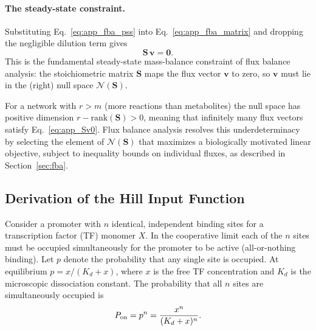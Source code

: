 \paragraph{The steady-state constraint.}
Substituting Eq.~\eqref{eq:app_fba_pss} into Eq.~\eqref{eq:app_fba_matrix}
and dropping the negligible dilution term gives
\begin{equation}\label{eq:app_Sv0}
  \boxed{\mathbf{S}\,\mathbf{v} = \mathbf{0}.}
\end{equation}
This is the fundamental steady-state mass-balance constraint of flux balance
analysis: the stoichiometric matrix $\mathbf{S}$ maps the flux vector
$\mathbf{v}$ to zero, so $\mathbf{v}$ must lie in the (right) null space
$\mathcal{N}(\mathbf{S})$.

For a network with $r > m$ (more reactions than metabolites) the null space
has positive dimension $r - \mathrm{rank}(\mathbf{S}) > 0$, meaning that
infinitely many flux vectors satisfy Eq.~\eqref{eq:app_Sv0}.  Flux balance
analysis resolves this underdeterminacy by selecting the element of
$\mathcal{N}(\mathbf{S})$ that maximizes a biologically motivated linear
objective, subject to inequality bounds on individual fluxes, as described
in Section~\ref{sec:fba}.

\subsection{Derivation of the Hill Input Function}
\label{sec:hill_derivation}

Consider a promoter with $n$ identical, independent binding sites for a
transcription factor (TF) monomer $X$.  In the cooperative limit each of the
$n$ sites must be occupied simultaneously for the promoter to be active (all-or-nothing
binding).  Let $p$ denote the probability that any single site is occupied.
At equilibrium $p = x / (K_d + x)$, where $x$ is the free TF concentration
and $K_d$ is the microscopic dissociation constant.  The probability that
all $n$ sites are simultaneously occupied is
\begin{equation}
  P_{\rm on} = p^n = \frac{x^n}{(K_d + x)^n}.
\end{equation}

